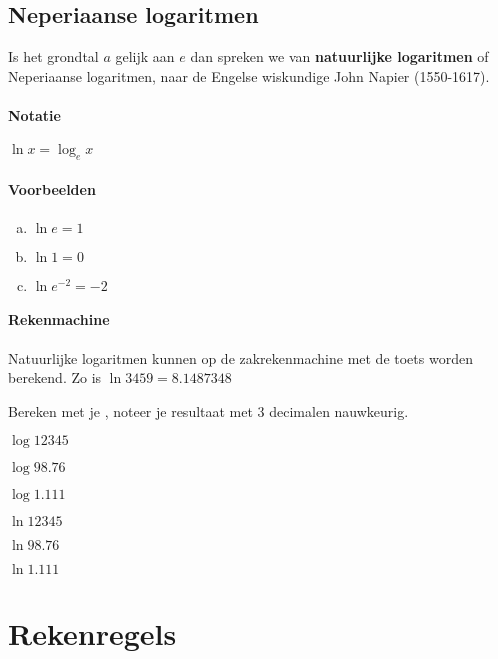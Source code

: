 \documentclass[12pt,twoside,a4paper]{article}
\begin{document}
\subsection{Neperiaanse logaritmen}

Is het grondtal $a$ gelijk aan $e$ dan spreken we van {\bf natuurlijke logaritmen} of Neperiaanse logaritmen, naar de Engelse wiskundige John Napier (1550-1617).

\paragraph{Notatie} $\ln x = \log_{e} x$

\paragraph{Voorbeelden}\begin{minipage}[t]{\textwidth}
\begin{enumerate}[(a)]
  \item $\ln e = 1$
  \item $\ln 1 = 0$
  \item $\ln e^{-2} = -2$
\end{enumerate}
\end{minipage}

\paragraph{Rekenmachine} Natuurlijke logaritmen kunnen op de zakrekenmachine met de  toets worden berekend.
Zo is $\ln 3459 = 8.1487348$

\begin{oefening}
Bereken met je , noteer je resultaat met 3 decimalen nauwkeurig.
\begin{exlist}{2}
  \item $\log 12345$
  \item $\log 98.76$
  \item $\log 1.111$
  \item $\ln 12345$
  \item $\ln 98.76$
  \item $\ln 1.111$
\end{exlist}
\end{oefening}

\cleardoublepage
\section{Rekenregels}
\end{document}
